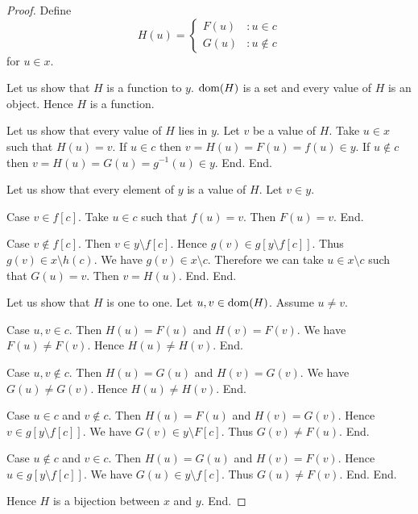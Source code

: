 \documentclass{article}
\begin{document}
\begin{forthel}
\begin{proof}
        Define \[ H(u) =
          \begin{cases}
            F(u) & : u \in c \\
            G(u) & : u \notin c
          \end{cases} \]
        for $u \in x$.

        Let us show that $H$ is a function to $y$.
          $\operatorname{dom}(H)$ is a set and every value of $H$ is an object.
          Hence $H$ is a function.

          Let us show that every value of $H$ lies in $y$.
            Let $v$ be a value of $H$.
            Take $u \in x$ such that $H(u) = v$.
            If $u \in c$ then $v = H(u) = F(u) = f(u) \in y$.
            If $u \notin c$ then $v = H(u) = G(u) = g^{-1}(u) \in y$.
          End.
        End.

        Let us show that every element of $y$ is a value of $H$.
          Let $v \in y$.

          Case $v \in f[c]$.
            Take $u \in c$ such that $f(u) = v$.
            Then $F(u) = v$.
          End.

          Case $v \notin f[c]$.
            Then $v \in y \setminus f[c]$.
            Hence $g(v) \in g[y \setminus f[c]]$.
            Thus $g(v) \in x \setminus h(c)$.
            We have $g(v) \in x \setminus c$.
            Therefore we can take $u \in x \setminus c$ such that $G(u) = v$.
            Then $v = H(u)$.
          End.
        End.

        Let us show that $H$ is one to one.
          Let $u,v \in \operatorname{dom}(H)$.
          Assume $u \neq v$.

          Case $u,v \in c$.
            Then $H(u) = F(u)$ and $H(v) = F(v)$.
            We have $F(u) \neq F(v)$.
            Hence $H(u) \neq H(v)$.
          End.

          Case $u,v \notin c$.
            Then $H(u) = G(u)$ and $H(v) = G(v)$.
            We have $G(u) \neq G(v)$.
            Hence $H(u) \neq H(v)$.
          End.

          Case $u \in c$ and $v \notin c$.
            Then $H(u) = F(u)$ and $H(v) = G(v)$.
            Hence $v \in g[y \setminus f[c]]$.
            We have $G(v) \in y \setminus F[c]$.
            Thus $G(v) \neq F(u)$.
          End.

          Case $u \notin c$ and $v \in c$.
            Then $H(u) = G(u)$ and $H(v) = F(v)$.
            Hence $u \in g[y \setminus f[c]]$.
            We have $G(u) \in y \setminus f[c]$.
            Thus $G(u) \neq F(v)$.
          End.
        End.

        Hence $H$ is a bijection between $x$ and $y$.
      End.
    \end{proof}
  \end{forthel}
\end{document}

